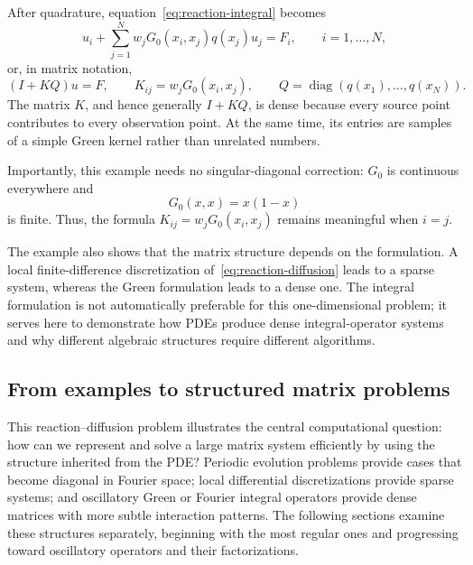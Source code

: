 \documentclass[11pt,a4paper]{article}
\numberwithin{equation}{section}
\begin{document}
After quadrature, equation~\eqref{eq:reaction-integral} becomes
\begin{equation}
    u_i+\sum_{j=1}^{N}w_jG_0(x_i,x_j)q(x_j)u_j=F_i,
    \qquad i=1,\ldots,N,
    \label{eq:reaction-discrete-sum}
\end{equation}
or, in matrix notation,
\begin{equation}
    (I+KQ)u=F,
    \qquad K_{ij}=w_jG_0(x_i,x_j),
    \qquad Q=\operatorname{diag}(q(x_1),\ldots,q(x_N)).
    \label{eq:reaction-system}
\end{equation}
The matrix $K$, and hence generally $I+KQ$, is dense because every source point contributes to every observation point. At the same time, its entries are samples of a simple Green kernel rather than unrelated numbers.

Importantly, this example needs no singular-diagonal correction: $G_0$ is continuous everywhere and
\begin{equation}
    G_0(x,x)=x(1-x)
    \label{eq:green-diagonal}
\end{equation}
is finite. Thus, the formula $K_{ij}=w_jG_0(x_i,x_j)$ remains meaningful when $i=j$.

The example also shows that the matrix structure depends on the formulation. A local finite-difference discretization of~\eqref{eq:reaction-diffusion} leads to a sparse system, whereas the Green formulation leads to a dense one. The integral formulation is not automatically preferable for this one-dimensional problem; it serves here to demonstrate how PDEs produce dense integral-operator systems and why different algebraic structures require different algorithms.

\subsection{From examples to structured matrix problems}

This reaction--diffusion problem illustrates the central computational question: how can we represent and solve a large matrix system efficiently by using the structure inherited from the PDE? Periodic evolution problems provide cases that become diagonal in Fourier space; local differential discretizations provide sparse systems; and oscillatory Green or Fourier integral operators provide dense matrices with more subtle interaction patterns. The following sections examine these structures separately, beginning with the most regular ones and progressing toward oscillatory operators and their factorizations.
\end{document}

